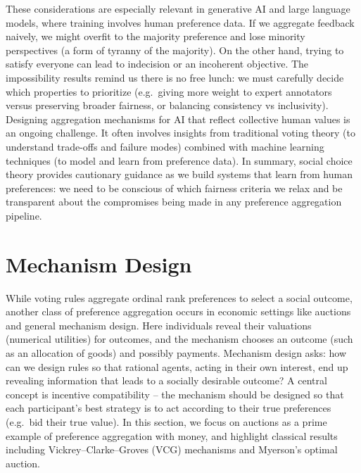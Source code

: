 \documentclass[
  letterpaper,
  numbers=noenddot,
  DIV=11]{scrreprt}
\theoremstyle{plain}
\theoremstyle{definition}
\theoremstyle{remark}
\begin{document}
These considerations are especially relevant in generative AI and large
language models, where training involves human preference data. If we
aggregate feedback naively, we might overfit to the majority preference
and lose minority perspectives (a form of tyranny of the majority). On
the other hand, trying to satisfy everyone can lead to indecision or an
incoherent objective. The impossibility results remind us there is no
free lunch: we must carefully decide which properties to prioritize
(e.g.~giving more weight to expert annotators versus preserving broader
fairness, or balancing consistency vs inclusivity). Designing
aggregation mechanisms for AI that reflect collective human values is an
ongoing challenge. It often involves insights from traditional voting
theory (to understand trade-offs and failure modes) combined with
machine learning techniques (to model and learn from preference data).
In summary, social choice theory provides cautionary guidance as we
build systems that learn from human preferences: we need to be conscious
of which fairness criteria we relax and be transparent about the
compromises being made in any preference aggregation pipeline.

\section{Mechanism Design}\label{single-item-auctions}

While voting rules aggregate ordinal rank preferences to select a social
outcome, another class of preference aggregation occurs in economic
settings like auctions and general mechanism design. Here individuals
reveal their valuations (numerical utilities) for outcomes, and the
mechanism chooses an outcome (such as an allocation of goods) and
possibly payments. Mechanism design asks: how can we design rules so
that rational agents, acting in their own interest, end up revealing
information that leads to a socially desirable outcome? A central
concept is incentive compatibility -- the mechanism should be designed
so that each participant's best strategy is to act according to their
true preferences (e.g.~bid their true value). In this section, we focus
on auctions as a prime example of preference aggregation with money, and
highlight classical results including Vickrey--Clarke--Groves (VCG)
mechanisms and Myerson's optimal auction.
\end{document}
